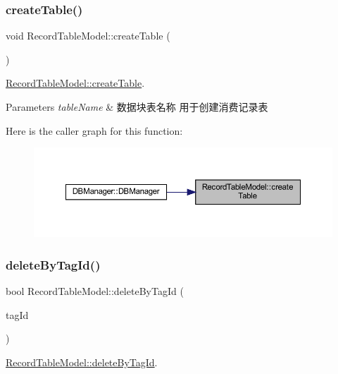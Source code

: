 \subsubsection{\texorpdfstring{createTable()}{createTable()}}
{\footnotesize\ttfamily void Record\+Table\+Model\+::create\+Table (\begin{DoxyParamCaption}{ }\end{DoxyParamCaption})}



\mbox{\hyperlink{class_record_table_model_a22b3345225e4d7e7e30ca0001c5c35a3}{Record\+Table\+Model\+::create\+Table}}. 


\begin{DoxyParams}{Parameters}
{\em table\+Name} & 数据块表名称 用于创建消费记录表 \\
\hline
\end{DoxyParams}
Here is the caller graph for this function\+:
\nopagebreak
\begin{figure}[H]
\begin{center}
\leavevmode
\includegraphics[width=350pt]{class_record_table_model_a22b3345225e4d7e7e30ca0001c5c35a3_icgraph}
\end{center}
\end{figure}
\mbox{\label{class_record_table_model_a100e9367452b370e3959d3694d911d22}} 
\subsubsection{\texorpdfstring{deleteByTagId()}{deleteByTagId()}}
{\footnotesize\ttfamily bool Record\+Table\+Model\+::delete\+By\+Tag\+Id (\begin{DoxyParamCaption}\item[{const Q\+String \&}]{tag\+Id }\end{DoxyParamCaption})}



\mbox{\hyperlink{class_record_table_model_a100e9367452b370e3959d3694d911d22}{Record\+Table\+Model\+::delete\+By\+Tag\+Id}}. 


